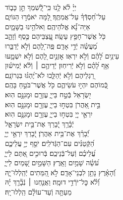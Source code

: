 \documentclass[twoside, openany, parskip=half, 11pt]{book}
\begin{document}
{\begin{narrow}
\\
יְיָ֗ לֹ֫א לָ֥נוּ \hfill כִּֽי־לְֿֿ֭שִׁמְךָ תֵּ֣ן כָּב֑וֹד \\ עַל־חַ֝סְדְּֿֿךָ֗ עַל־אֲמִתֶּֽךָ׃ \hfill
לָ֭מָּה יֹאמְֿר֣וּ הַגּוֹיִ֑ם\\ אַיֵּה־נָ֗֝א אֱלֹהֵיהֶֽם׃ \hfill
וֵאלֹהֵ֥ינוּ בַשָּׁמָ֑יִם\\ כֹּ֖ל אֲשֶׁר־חָפֵ֣ץ עָשָֽׂה׃ \hfill
עֲֽ֭צַבֵּיהֶם כֶּ֣סֶף וְֿזָהָ֑ב\\ מַ֝עֲשֵׂ֗ה יְֿדֵ֣י אָדָֽם׃ \hfill
פֶּֽה־לָ֭הֶם וְֿלֹ֣א יְֿדַבֵּ֑רוּ\\ עֵינַ֥יִם לָ֝הֶ֗ם וְֿלֹ֣א יִרְאֽוּ׃ \hfill
אׇזְנַ֣יִם לָ֭הֶם וְֿלֹ֣א יִשְׁמָ֑עוּ\\ אַ֥ף לָ֝הֶ֗ם וְֿלֹ֣א יְֿרִיחֽוּן׃ \hfill
יְֿדֵיהֶ֤ם ׀ וְֿלֹ֬א יְֿמִישׁ֗וּן\\ רַ֭גְלֵיהֶם וְֿלֹ֣א יְֿהַלֵּ֑כוּ \hfill לֹא־יֶ֝הְגּ֗וּ בִּגְרוֹנָֽם׃ \\
כְּֿ֭מוֹהֶם יִהְי֣וּ עֹשֵׂיהֶ֑ם \hfill כֹּ֖ל אֲשֶׁר־בֹּטֵ֣חַ בָּהֶֽם׃ \\
יִ֭שְׂרָאֵל בְּֿטַ֣ח בַּייָ֑ \hfill עֶזְרָ֖ם וּמָגִנָּ֣ם הֽוּא׃ \\
בֵּ֣ית אַ֭הֲרֹן בִּטְח֣וּ בַייָ֑ \hfill עֶזְרָ֖ם וּמָגִנָּ֣ם הֽוּא׃ \\
יִרְאֵ֣י יְיָ֭ בִּטְח֣וּ בַייָ֑ \hfill עֶזְרָ֖ם וּמָגִנָּ֣ם הֽוּא׃ \\

יְֿבָ֫רֵ֥ךְ יְֿ֭בָרֵךְ \hfill אֶת־בֵּ֣ית יִשְׂרָאֵ֑ל\\ יְֿ֝בָרֵ֗ךְ אֶת־בֵּ֥ית אַהֲרֹֽן׃ \hfill
יְֿ֭בָרֵךְ יִרְאֵ֣י יְיָ֑\\ הַ֝קְּֿטַנִּ֗ים עִם־הַגְּֿדֹלִֽים׃ \hfill
יֹסֵ֣ף יְיָ֣ עֲלֵיכֶ֑ם\\ עֲ֝לֵיכֶ֗ם וְֿעַל־בְּֿנֵיכֶֽם׃ \hfill
בְּֿרוּכִ֣ים אַ֭תֶּם לַייָ֑\\ עֹ֝שֵׂ֗ה שָׁמַ֥יִם וָאָֽרֶץ׃ \hfill
הַשָּׁמַ֣יִם שָׁ֭מַיִם לַייָ֑\\ וְֿ֝הָאָ֗רֶץ נָתַ֥ן לִבְנֵי־אָדָֽם׃ \hfill
לֹ֣א הַ֭מֵּתִים יְֿהַֽלְלוּ־יָ֑הּ\\ וְֿ֝לֹ֗א כׇּל־יֹרְֿדֵ֥י דוּמָֽה׃ \hfill
וַאֲנַ֤חְנוּ ׀ נְֿבָ֘רֵ֤ךְ יָ֗הּ\\ מֵעַתָּ֥ה וְֿעַד־עוֹלָ֗ם הַֽלְלוּ־יָֽהּ׃ \hfill \break



\end{narrow}}
\end{document}
